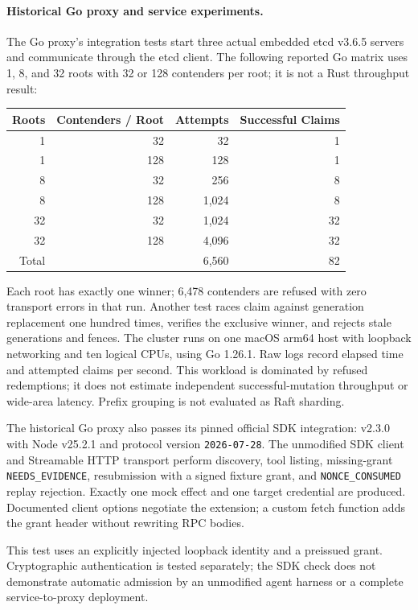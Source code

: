 \paragraph{Historical Go proxy and service experiments.}
The Go proxy's integration tests start three actual embedded etcd v3.6.5 servers and communicate through the etcd client. The following reported Go matrix uses 1, 8, and 32 roots with 32 or 128 contenders per root; it is not a Rust throughput result:
\begin{center}
\small
\begin{tabular}{rrrr}
\toprule
\textbf{Roots} & \textbf{Contenders / Root} & \textbf{Attempts} & \textbf{Successful Claims}\\
\midrule
1 & 32 & 32 & 1\\
1 & 128 & 128 & 1\\
8 & 32 & 256 & 8\\
8 & 128 & 1,024 & 8\\
32 & 32 & 1,024 & 32\\
32 & 128 & 4,096 & 32\\
\midrule
Total & & 6,560 & 82\\
\bottomrule
\end{tabular}
\end{center}
Each root has exactly one winner; 6,478 contenders are refused with zero transport errors in that run. Another test races claim against generation replacement one hundred times, verifies the exclusive winner, and rejects stale generations and fences. The cluster runs on one macOS arm64 host with loopback networking and ten logical CPUs, using Go 1.26.1. Raw logs record elapsed time and attempted claims per second. This workload is dominated by refused redemptions; it does not estimate independent successful-mutation throughput or wide-area latency. Prefix grouping is not evaluated as Raft sharding.

The historical Go proxy also passes its pinned official SDK integration:  v2.3.0 with Node v25.2.1 and protocol version \texttt{2026-07-28}. The unmodified SDK client and Streamable HTTP transport perform discovery, tool listing, missing-grant \texttt{NEEDS\_EVIDENCE}, resubmission with a signed fixture grant, and \texttt{NONCE\_CONSUMED} replay rejection. Exactly one mock effect and one target credential are produced. Documented client options negotiate the extension; a custom fetch function adds the grant header without rewriting RPC bodies.

This test uses an explicitly injected loopback identity and a preissued grant. Cryptographic authentication is tested separately; the SDK check does not demonstrate automatic admission by an unmodified agent harness or a complete service-to-proxy deployment.


